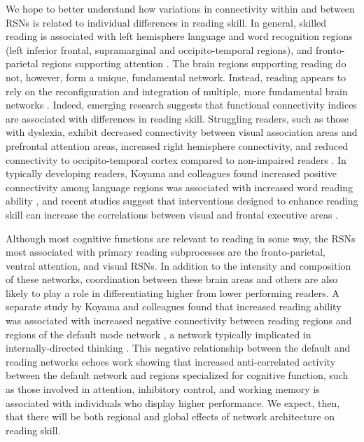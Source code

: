 We hope to better understand how variations in connectivity within and between RSNs is related to individual differences in reading skill. In general, skilled reading is associated with left hemisphere language and word recognition regions (left inferior frontal, supramarginal and occipito-temporal regions), and fronto-parietal regions supporting attention \citep{Paulesu2014}. The brain regions supporting reading do not, however, form a unique, fundamental network. Instead, reading appears to rely on the reconfiguration and integration of multiple, more fundamental brain networks \citep{Koyama2010, Vogel2013}. Indeed, emerging research suggests that functional connectivity indices are associated with differences in reading skill. Struggling readers, such as those with dyslexia, exhibit decreased connectivity between visual association areas and prefrontal attention areas, increased right hemisphere connectivity, and reduced connectivity to occipito-temporal cortex compared to non-impaired readers \citep{Finn2014}. In typically developing readers, Koyama and colleagues found increased positive connectivity among language regions was associated with increased word reading ability \citep{Koyama2011}, and recent studies suggest that interventions designed to enhance reading skill can increase the correlations between visual and frontal executive areas \citep{Horowitz-Kraus2015}. 

Although most cognitive functions are relevant to reading in some way, the RSNs most associated with primary reading subprocesses are the fronto-parietal, ventral attention, and visual RSNs. In addition to the intensity and composition of these networks, coordination between these brain areas and others are also likely to play a role in differentiating higher from lower performing readers. A separate study by Koyama and colleagues found that increased reading ability was associated with increased negative connectivity between reading regions and regions of the default mode network \citep{Koyama2013}, a network typically implicated in internally-directed thinking \citep{Andrews-Hanna2014}. This negative relationship between the default and reading networks echoes work showing that increased anti-correlated activity between the default network and regions specialized for cognitive function, such as those involved in attention, inhibitory control, and working memory is associated with individuals who display higher performance. We expect, then, that there will be both regional and global effects of network architecture on reading skill.

